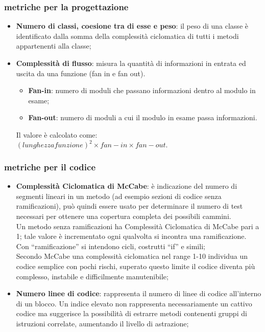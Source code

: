 {\subsubsection{metriche per la progettazione}{
	\begin{itemize}
		\item \textbf{Numero di classi, coesione tra di esse e peso}: il peso di una	classe è identificato dalla somma della complessità ciclomatica di tutti i metodi appartenenti alla classe;
	 	\item \textbf{Complessità di flusso}: misura la quantità di informazioni in	entrata ed uscita da una funzione (fan in e fan out).\\
	 	\begin{itemize}
	 	 \item \textbf{Fan-in}: numero di moduli che passano informazioni dentro al modulo in esame;
	 	 \item \textbf{Fan-out}: numero di moduli a cui il modulo in esame passa informazioni.
	 	\end{itemize}
	 	Il valore è calcolato come:\\
	 	$(lunghezzafunzione)^2\times fan-in \times fan-out.$
	\end{itemize}
\subsubsection{metriche per il codice}{
	\begin{itemize}
		\item \textbf{Complessità Ciclomatica di McCabe}: è indicazione del numero di segmenti lineari in un metodo (ad esempio sezioni di codice senza ramificazioni), può quindi essere usato per determinare il numero di test necessari per ottenere una copertura completa dei possibili cammini.  \\
		Un metodo senza ramificazioni ha Complessità Ciclomatica di McCabe pari a 1; tale valore è incrementato ogni qualvolta si incontra una ramificazione.  \\
		Con “ramificazione” si intendono cicli, costrutti “if” e simili;\\
		Secondo McCabe una complessità ciclomatica nel range 1-10 individua un codice semplice con pochi rischi, superato questo limite il codice diventa più complesso, instabile e difficilmente manutenibile;
		
		\item \textbf{Numero linee di codice}: rappresenta il numero di linee di codice all'interno di un blocco. 
		Un indice elevato non rappresenta necessariamente un cattivo codice ma suggerisce la possibilità di estrarre metodi contenenti gruppi di istruzioni correlate, aumentando il livello di astrazione;
		

\end{itemize}}}}

